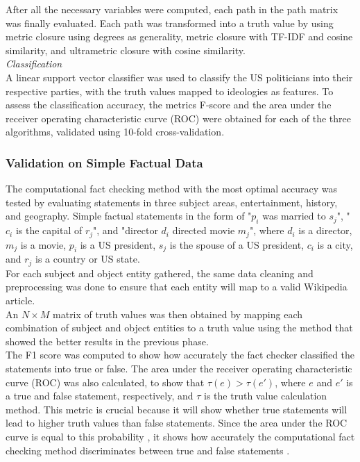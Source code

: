 \documentclass[10pt,11pt,12pt,oneside]{book}
\begin{document}
After all the necessary variables were computed, each path in the path matrix was finally evaluated. Each path was transformed into a truth value by using metric closure using degrees as generality, metric closure with TF-IDF and cosine similarity, and ultrametric closure with cosine similarity.\\

\textit{Classification}\\

A linear support vector classifier was used to classify the US politicians into their respective parties, with the truth values mapped to ideologies as features. To assess the classification accuracy, the metrics F-score and the area under the receiver operating characteristic curve (ROC) were obtained for each of the three algorithms, validated using 10-fold cross-validation.

\subsubsection{Validation on Simple Factual Data}
The computational fact checking method with the most optimal accuracy was tested by evaluating statements in three subject areas, entertainment, history, and geography. Simple factual statements in the form of "$ p_{i} $ was married to $ s_{j} $", "$ c_{i} $ is the capital of $ r_{j} $", and "director $ d_{i} $ directed movie $ m_{j} $", where $ d_{i} $ is a director, $ m_{j} $ is a movie, $ p_{i} $ is a US president, $ s_{j} $ is the spouse of a US president, $ c_{i} $ is a city, and $ r_{j} $ is a country or US state. \\

For each subject and object entity gathered, the same data cleaning and preprocessing was done to ensure that each entity will map to a valid Wikipedia article.\\

An $ N \times M $ matrix of truth values was then obtained by mapping each combination of subject and object entities to a truth value using the method that showed the better results in the previous phase.\\

The F1 score was computed to show how accurately the fact checker classified the statements into true or false. The area under the receiver operating characteristic curve (ROC) was also calculated, to show that $ \tau (e) > \tau (e \prime)$, where $ e $ and $ e \prime $ is a true and false statement, respectively, and $ \tau $ is the truth value calculation method. This metric is crucial because it will show whether true statements will lead to higher truth values than false statements. Since the area under the ROC curve is equal to this probability \cite{Fawcett2006}, it shows how accurately the computational fact checking method discriminates between true and false statements .
\end{document}
